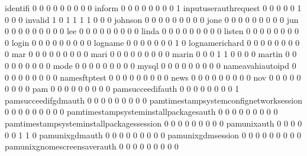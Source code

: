 \documentclass[compress,8pt]{beamer}
\begin{document}
\begin{frame}
\begin{Schunk}
  identifi                                   0   0   0   0   0   0   0   0   0
  inform                                     0   0   0   0   0   0   0   0   1
  inputuserauthrequest                       0   0   0   0   0   1   0   0   0
  invalid                                    1   0   1   1   1   1   0   0   0
  johnson                                    0   0   0   0   0   0   0   0   0
  jone                                       0   0   0   0   0   0   0   0   0
  jun                                        0   0   0   0   0   0   0   0   0
  lee                                        0   0   0   0   0   0   0   0   0
  linda                                      0   0   0   0   0   0   0   0   0
  listen                                     0   0   0   0   0   0   0   0   0
  login                                      0   0   0   0   0   0   0   0   0
  logname                                    0   0   0   0   0   0   0   1   0
  lognamerichard                             0   0   0   0   0   0   0   0   0
  mar                                        0   0   0   0   0   0   0   0   0
  mari                                       0   0   0   0   0   0   0   0   0
  marin                                      0   0   0   1   1   0   0   0   0
  martin                                     0   0   0   0   0   0   0   0   0
  mode                                       0   0   0   0   0   0   0   0   0
  mysql                                      0   0   0   0   0   0   0   0   0
  nameavahiautoipd                           0   0   0   0   0   0   0   0   0
  namesftptest                               0   0   0   0   0   0   0   0   0
  news                                       0   0   0   0   0   0   0   0   0
  nov                                        0   0   0   0   0   0   0   0   0
  pam                                        0   0   0   0   0   0   0   0   0
  pamsucceedifauth                           0   0   0   0   0   0   0   0   1
  pamsucceedifgdmauth                        0   0   0   0   0   0   0   0   0
  pamtimestampsystemconfignetworksession     0   0   0   0   0   0   0   0   0
  pamtimestampsysteminstallpackagesauth      0   0   0   0   0   0   0   0   0
  pamtimestampsysteminstallpackagessession   0   0   0   0   0   0   0   0   0
  pamunixauth                                0   0   0   0   0   0   1   1   0
  pamunixgdmauth                             0   0   0   0   0   0   0   0   0
  pamunixgdmsession                          0   0   0   0   0   0   0   0   0
  pamunixgnomescreensaverauth                0   0   0   0   0   0   0   0   0

\end{Schunk}
\end{frame}
\end{document}
